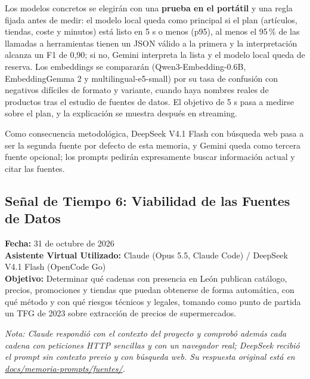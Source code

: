 Los modelos concretos se elegirán con una \textbf{prueba en el portátil} y una regla fijada antes de medir: el modelo local queda como principal si el plan (artículos, tiendas, coste y minutos) está listo en 5 s o menos (p95), al menos el 95\,\% de las llamadas a herramientas tienen un JSON válido a la primera y la interpretación alcanza un F1 de 0,90; si no, Gemini interpreta la lista y el modelo local queda de reserva. Los embeddings se compararán (Qwen3-Embedding-0.6B, EmbeddingGemma 2 y multilingual-e5-small) por su tasa de confusión con negativos difíciles de formato y variante, cuando haya nombres reales de productos tras el estudio de fuentes de datos. El objetivo de 5 s pasa a medirse sobre el plan, y la explicación se muestra después en streaming.

Como consecuencia metodológica, DeepSeek V4.1 Flash con búsqueda web pasa a ser la segunda fuente por defecto de esta memoria, y Gemini queda como tercera fuente opcional; los prompts pedirán expresamente buscar información actual y citar las fuentes.

\vspace{0.5cm}

\subsection{Señal de Tiempo 6: Viabilidad de las Fuentes de Datos}
\textbf{Fecha:} 31 de octubre de 2026 \\
\textbf{Asistente Virtual Utilizado:} Claude (Opus 5.5, Claude Code) / DeepSeek V4.1 Flash (OpenCode Go) \\
\textbf{Objetivo:} Determinar qué cadenas con presencia en León publican catálogo, precios, promociones y tiendas que puedan obtenerse de forma automática, con qué método y con qué riesgos técnicos y legales, tomando como punto de partida un TFG de 2023 sobre extracción de precios de supermercados.

\textit{Nota: Claude respondió con el contexto del proyecto y comprobó además cada cadena con peticiones HTTP sencillas y con un navegador real; DeepSeek recibió el prompt sin contexto previo y con búsqueda web. Su respuesta original está en \url{docs/memoria-prompts/fuentes/}.}

